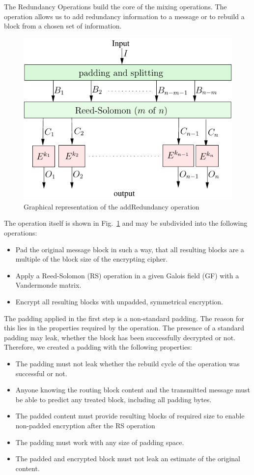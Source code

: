 \documentclass[acmsmall, screen, review]{acmart}
\begin{document}
	The Redundancy Operations build the core of the mixing operations. The operation allows us to add redundancy information to a message or to rebuild a block from a chosen set of information. 
	
	\begin{figure}[ht]\centering
		\includegraphics[width=0.5\columnwidth]{addRedundancyOp}
		\caption{Graphical representation of the addRedundancy operation}
		\label{fig:addRedundancyOperation}
	\end{figure}
	
	The operation itself is shown in Fig.~\ref{fig:addRedundancyOperation} and may be subdivided into the following operations:
	\begin{itemize}
		\item Pad the original message block in such a way, that all resulting blocks are a multiple of the block size of the encrypting cipher.
		\item Apply a Reed-Solomon (RS) operation in a given Galois field (GF) with a Vandermonde matrix.
		\item Encrypt all resulting blocks with unpadded, symmetrical encryption.
	\end{itemize}
	
	The padding applied in the first step is a non-standard padding. The reason for this lies in the properties required by the operation. The presence of a standard padding may leak, whether the block has been successfully decrypted or not. Therefore, we created a padding with the following properties:
	\begin{itemize}
		\item The padding must not leak whether the rebuild cycle of the operation was successful or not.
		\item Anyone knowing the routing block content and the transmitted message must be able to predict any treated block, including all padding bytes.
		\item The padded content must provide resulting blocks of required size to enable non-padded encryption after the RS operation
		\item The padding must work with any size of padding space.
		\item The padded and encrypted block must not leak an estimate of the original content.
	\end{itemize}
	
\end{document}
